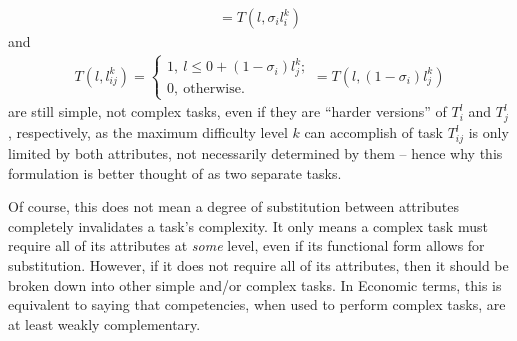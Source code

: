 {\begin{definition}
\begin{gather}
            = T(l, \sigma_{i} l_{i}^{k})
        \end{gather}
        and 
        \begin{gather}
            T(l, l_{ij}^{k}) =
            \begin{cases}
                1, \ l \leq 0 + (1 - \sigma_{i}) l_{j}^{k}; \\
                0, \ \text{otherwise.}
            \end{cases}
            = T(l, (1 - \sigma_{i}) l_{j}^{k})
        \end{gather}
        are still simple, not complex tasks, even if they are ``harder versions'' of $T_{i}^{l}$ and $T_{j}^{l}$, respectively, as the maximum difficulty level $k$ can accomplish of task $T_{ij}^{l}$ is only limited by both attributes, not necessarily determined by them -- hence why this formulation is better thought of as two separate tasks.
        
        Of course, this does not mean a degree of substitution between attributes completely invalidates a task's complexity. It only means a complex task must require all of its attributes at \textit{some} level, even if its functional form allows for substitution. However, if it does not require all of its attributes, then it should be broken down into other simple and/or complex tasks. In Economic terms, this is equivalent to saying that competencies, when used to perform complex tasks, are at least weakly complementary.
    \end{definition}
}


